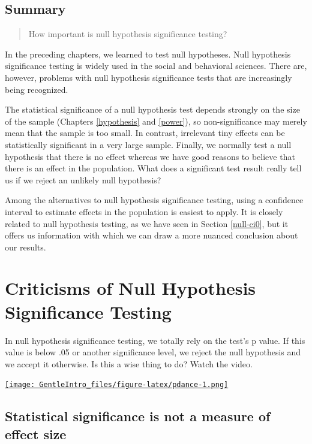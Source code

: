 \documentclass[a4paper]{book}
\theoremstyle{definition}
\theoremstyle{definition}
\theoremstyle{definition}
\theoremstyle{remark}
\begin{document}
\subsection*{Summary}\label{summary-5}

\begin{quote}
How important is null hypothesis significance testing?
\end{quote}

In the preceding chapters, we learned to test null hypotheses. Null
hypothesis significance testing is widely used in the social and
behavioral sciences. There are, however, problems with null hypothesis
significance tests that are increasingly being recognized.

The statistical significance of a null hypothesis test depends strongly
on the size of the sample (Chapters \ref{hypothesis} and \ref{power}),
so non-significance may merely mean that the sample is too small. In
contrast, irrelevant tiny effects can be statistically significant in a
very large sample. Finally, we normally test a null hypothesis that
there is no effect whereas we have good reasons to believe that there is
an effect in the population. What does a significant test result really
tell us if we reject an unlikely null hypothesis?

Among the alternatives to null hypothesis significance testing, using a
confidence interval to estimate effects in the population is easiest to
apply. It is closely related to null hypothesis testing, as we have seen
in Section \ref{null-ci0}, but it offers us information with which we
can draw a more nuanced conclusion about our results.

\section{Criticisms of Null Hypothesis Significance
Testing}\label{criticisms-of-null-hypothesis-significance-testing}

In null hypothesis significance testing, we totally rely on the test's p
value. If this value is below .05 or another significance level, we
reject the null hypothesis and we accept it otherwise. Is this a wise
thing to do? Watch the video.

\href{https://www.youtube.com/embed/ez4DgdurRPg}{\texttt{[image: GentleIntro\_files/figure-latex/pdance-1.png]}}

\subsection{Statistical significance is not a measure of effect
size}\label{statistical-significance-is-not-a-measure-of-effect-size}
\end{document}

